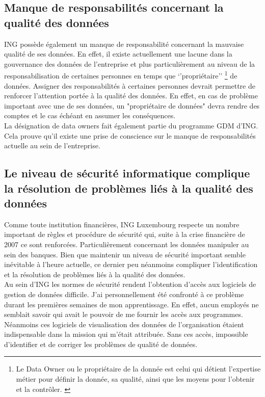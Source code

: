 \documentclass[a4paper, 12pt, french]{article}
\begin{document}
\subsection{Manque de responsabilités concernant la qualité des données}

ING possède également un manque de responsabilité concernant la mauvaise qualité de ses données. En effet, il existe actuellement une lacune dans la gouvernance des données de l'entreprise et plus particulièrement au niveau de la responsabilisation de certaines personnes en temps que ‘’propriétaire’’ \footnote{Le Data Owner ou le propriétaire de la donnée est celui qui détient l’expertise métier pour définir la donnée, sa qualité, ainsi que les moyens pour l’obtenir et la contrôler. \citep{LeJournaldesRHLeCoulisses}} de données. Assigner des responsabilités à certaines personnes devrait permettre de renforcer l'attention portée à la qualité des données. En effet, en cas de problème important avec une de ses données, un "propriétaire de données" devra rendre des comptes et le cas échéant en assumer les conséquences. \\ 

La désignation de data owners fait également partie du programme GDM d'ING. Cela prouve qu'il existe une prise de conscience sur le manque de responsabilités actuelle au sein de l'entreprise. 

\subsection{Le niveau de sécurité informatique complique la résolution de problèmes liés à la qualité des données}

Comme toute institution financières, ING Luxembourg respecte un nombre important de règles et procédure de sécurité qui, suite à la crise financière de 2007 ce sont renforcées. Particulièrement concernant les données manipuler au sein des banques. Bien que maintenir un niveau de sécurité important semble inévitable à l’heure actuelle, ce dernier peu néanmoins compliquer l’identification et la résolution de problèmes liés à la qualité des données. \\

Au sein d'ING les normes de sécurité rendent l’obtention d’accès aux logiciels de gestion de données difficile. J’ai personnellement été confronté à ce problème durant les premières semaines de mon apprentissage. En effet, aucun employés ne semblait savoir qui avait le pouvoir de me fournir les accès aux programmes. Néanmoins ces logiciels de visualisation des données de l’organisation étaient indispensable dans la mission qui m’était attribuée. Sans ces accès, impossible d’identifier et de corriger les problèmes de qualité de données. \\
\end{document}
